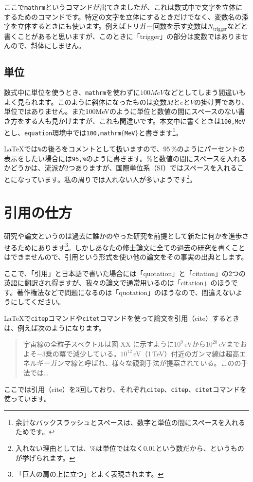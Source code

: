 ここで\texttt{\bs{}mathrm}というコマンドが出てきましたが、これは数式中で文字を立体にするためのコマンドです。特定の文字を立体にするときだけでなく、変数名の添字を立体するときにも使います。例えばトリガー回数を示す変数は$N_\mathrm{trigger}$などと書くことがあると思いますが、このときに「trigger」の部分は変数ではありませんので、斜体にしません。

\subsection{単位}
数式中に単位を使うとき、\texttt{\bs{}mathrm}を使わずに$100 MeV$などとしてしまう間違いもよく見られます。このように斜体になったものは変数$M$と$e$と$V$の掛け算であり、単位ではありません。また100MeVのように単位と数値の間にスペースのない書き方をする人も見かけますが、これも間違いです。本文中に書くときは\texttt{100\bs{},MeV}とし、\texttt{equation}環境中では\texttt{100\bs{},\bs{}mathrm\{MeV\}}と書きます\footnote{余計なバックスラッシュとスペースは、数字と単位の間にスペースを入れるためです。}。

\LaTeX{}では\texttt{\%}の後ろをコメントとして扱いますので、95\,\%のようにパーセントの表示をしたい場合には\texttt{95\bs{},\%}のように書きます。\%と数値の間にスペースを入れるかどうかは、流派が2つありますが、国際単位系（SI）ではスペースを入れることになっています。私の周りでは入れない人が多いようです\footnote{入れない理由としては、\%は単位ではなく0.01という数だから、というものが挙げられます。}。

\section{引用の仕方}

研究や論文というのは過去に誰かのやった研究を前提として新たに何かを進歩させるためにあります\footnote{「巨人の肩の上に立つ」とよく表現されます。}。しかしあなたの修士論文に全ての過去の研究を書くことはできませんので、引用という形式を使い他の論文をその事実の出典とします。

ここで、「引用」と日本語で書いた場合には「quotation」と「citation」の2つの英語に翻訳され得ますが、我々の論文で通常用いるのは「citation」のほうです。著作権法などで問題になるのは「quotation」のほうなので、間違えないようにしてください。

\LaTeX{}で\texttt{citep}コマンドや\texttt{citet}コマンドを使って論文を引用（cite）するときは、例えば次のようになります。

\begin{quote} %
  宇宙線の全粒子スペクトルは図 XX に示すように$10^9$\,eVから$10^{20}$\,eVまでおよそ$-3$乗の冪で減少している\citep{Swordy2001}。$10^{12}$\,eV（1\,TeV）付近のガンマ線は超高エネルギーガンマ線と呼ばれ、様々な観測手法が提案されている\citep[例えば][を見よ]{Okumura2005}。この\citet{Okumura2005}の手法では\ldots
\end{quote}
ここでは引用（cite）を3回しており、それぞれ\texttt{citep}、\texttt{citep}、\texttt{citet}コマンドを使っています。

